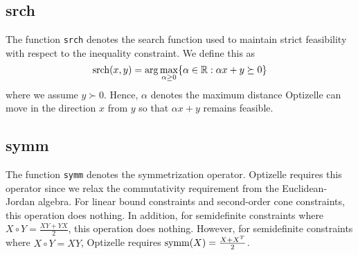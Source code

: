 \documentclass{report}
\newcommand{\re}{\mathbb{R}}
\begin{document}
\subsection{srch}

        The function \texttt{srch} denotes the search function used to maintain strict feasibility with respect to the inequality constraint.  We define this as
$$
    \textnormal{srch}(x,y)=\arg\max\limits_{\alpha\geq 0} \{ \alpha\in\re : \alpha x + y \succeq 0\}
$$
where we assume $y\succ 0$.  Hence, $\alpha$ denotes the maximum distance Optizelle can move in the direction $x$ from $y$ so that $\alpha x + y$ remains feasible.

\subsection{symm}

        The function \texttt{symm} denotes the symmetrization operator.  Optizelle requires this operator since we relax the commutativity requirement from the Euclidean-Jordan algebra.  For linear bound constraints and second-order cone constraints, this operation does nothing.  In addition, for semidefinite constraints where $X\circ Y=\frac{XY+YX}{2}$, this operation does nothing.  However, for semidefinite constraints where $X\circ Y=XY$, Optizelle requires $\textnormal{symm}(X)=\frac{X+X^T}{2}$.
\end{document}
